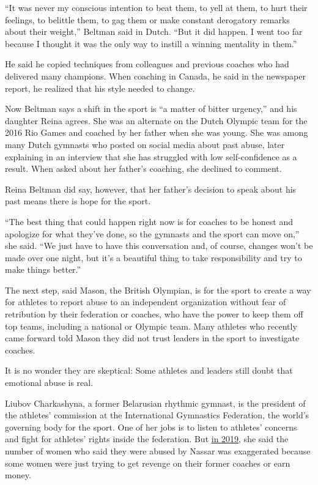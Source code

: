 ``It was never my conscious intention to beat them, to yell at them, to
hurt their feelings, to belittle them, to gag them or make constant
derogatory remarks about their weight,'' Beltman said in Dutch. ``But it
did happen. I went too far because I thought it was the only way to
instill a winning mentality in them.''

He said he copied techniques from colleagues and previous coaches who
had delivered many champions. When coaching in Canada, he said in the
newspaper report, he realized that his style needed to change.

Now Beltman says a shift in the sport is ``a matter of bitter urgency,''
and his daughter Reina agrees. She was an alternate on the Dutch Olympic
team for the 2016 Rio Games and coached by her father when she was
young. She was among many Dutch gymnasts who posted on social media
about past abuse, later explaining in an interview that she has
struggled with low self-confidence as a result. When asked about her
father's coaching, she declined to comment.

Reina Beltman did say, however, that her father's decision to speak
about his past means there is hope for the sport.

``The best thing that could happen right now is for coaches to be honest
and apologize for what they've done, so the gymnasts and the sport can
move on,'' she said. ``We just have to have this conversation and, of
course, changes won't be made over one night, but it's a beautiful thing
to take responsibility and try to make things better.''

The next step, said Mason, the British Olympian, is for the sport to
create a way for athletes to report abuse to an independent organization
without fear of retribution by their federation or coaches, who have the
power to keep them off top teams, including a national or Olympic team.
Many athletes who recently came forward told Mason they did not trust
leaders in the sport to investigate coaches.

It is no wonder they are skeptical: Some athletes and leaders still
doubt that emotional abuse is real.

Liubov Charkashyna, a former Belarusian rhythmic gymnast, is the
president of the athletes' commission at the International Gymnastics
Federation, the world's governing body for the sport. One of her jobs is
to listen to athletes' concerns and fight for athletes' rights inside
the federation. But
\href{http://eng.gymnovosti.com/charkashyna-on-sexual-abuse-in-sports-its-america-they-know-how-to-make-money/}{in
2019}, she said the number of women who said they were abused by Nassar
was exaggerated because some women were just trying to get revenge on
their former coaches or earn money.

